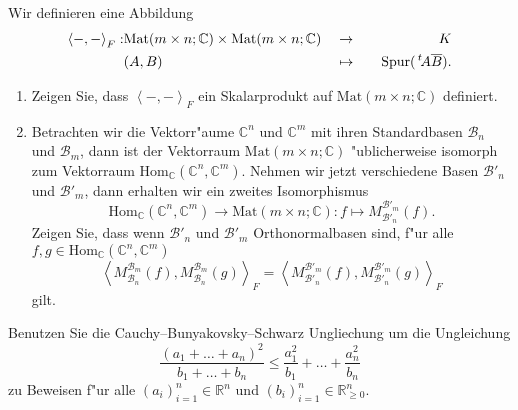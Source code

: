 \documentclass[a4,11pt]{article}
\begin{document}
\begin{aufgabe}[4 Punkte]
Wir definieren eine Abbildung 
\begin{align*}
\left<-,-\right>_{F} : &\text{Mat}(m \times n; \mathbb{C}) \times\text{Mat}(m \times n; \mathbb{C}) &&\to &&&K\\
&(A,B)&&\mapsto &&&\text{Spur}(\,^t\!A \overline{B}).
\end{align*}
\begin{enumerate}
\item Zeigen Sie, dass $\left<-,-\right>_{F}$ ein Skalarprodukt auf $\text{Mat}(m \times n; \mathbb{C})$ definiert.
\item Betrachten wir die Vektorr"aume $\mathbb{C}^n$ und $\mathbb{C}^m$ mit ihren Standardbasen $\mathcal{B}_n$ und $\mathcal{B}_m$, dann ist der Vektorraum $\text{Mat}(m \times n; \mathbb{C})$ "ublicherweise isomorph zum Vektorraum $\text{Hom}_\mathbb{C}(\mathbb{C}^n, \mathbb{C}^m)$. Nehmen wir jetzt verschiedene Basen $\mathcal{B}'_n$ und $\mathcal{B}'_m$, dann erhalten wir ein zweites Isomorphismus
\[
\text{Hom}_\mathbb{C}(\mathbb{C}^n, \mathbb{C}^m) \to \text{Mat}(m \times n; \mathbb{C}) : f \mapsto M_{\mathcal{B}'_n}^{\mathcal{B}'_m}(f).
\]
Zeigen Sie, dass wenn $\mathcal{B}'_n$ und $\mathcal{B}'_m$ Orthonormalbasen sind, f"ur alle $f, g \in \text{Hom}_\mathbb{C}(\mathbb{C}^n, \mathbb{C}^m)$
\[
\left<M_{\mathcal{B}_n}^{\mathcal{B}_m}(f),M_{\mathcal{B}_n}^{\mathcal{B}_m}(g)\right>_{F} = \left<M_{\mathcal{B}'_n}^{\mathcal{B}'_m}(f),M_{\mathcal{B}'_n}^{\mathcal{B}'_m}(g)\right>_{F}
\]
gilt.
\begin{center}

\end{center}
\end{enumerate}
\end{aufgabe}

\begin{aufgabe}[4 Punkte]
Benutzen Sie die Cauchy–Bunyakovsky–Schwarz Ungliechung um die Ungleichung
\[
\frac{(a_1 + \dots +  a_n)^2}{b_1 + \dots + b_n} \leq \frac{a_1^2}{b_1} + \dots + \frac{a_n^2}{b_n}
\]
zu Beweisen f"ur alle $(a_i)_{i = 1}^n \in \mathbb{R}^n$ und $(b_i)_{i=1}^n \in \mathbb{R}^n_{\geq 0}$.
\end{aufgabe}
\end{document}
